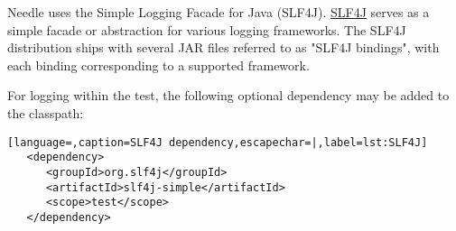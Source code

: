 Needle uses the Simple Logging Facade for Java (SLF4J). \href{http://www.slf4j.org/manual.html}{SLF4J} serves as a simple facade or 
abstraction for various logging frameworks.
The SLF4J distribution ships with several JAR files referred to as "SLF4J bindings", with each binding corresponding to a supported framework.

For logging within the test, the following optional dependency may be added to the classpath:

\begin{lstlisting}[language=,caption=SLF4J dependency,escapechar=|,label=lst:SLF4J]
   <dependency>
      <groupId>org.slf4j</groupId>
      <artifactId>slf4j-simple</artifactId>
      <scope>test</scope>
   </dependency>
\end{lstlisting}

